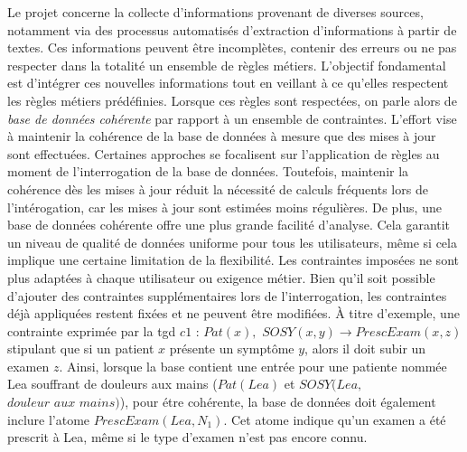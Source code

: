 Le projet concerne la collecte d'informations provenant de diverses sources, notamment via des processus automatisés d'extraction d'informations à partir de textes.
Ces informations peuvent être incomplètes, contenir des erreurs ou ne pas respecter dans la totalité un ensemble de règles métiers.
L'objectif fondamental est d'intégrer ces nouvelles informations tout en veillant à ce qu'elles respectent les règles métiers prédéfinies.
Lorsque ces règles sont respectées, on parle alors de \emph{base de données cohérente} par rapport à un ensemble de contraintes.
L'effort vise à maintenir la cohérence de la base de données à mesure que des mises à jour sont effectuées.
Certaines approches se focalisent sur l'application de règles au moment de l'interrogation de la base de données.
Toutefois, maintenir la cohérence dès les mises à jour réduit la nécessité de calculs fréquents lors de l'intérogation, car les mises à jour sont estimées moins régulières.
De plus, une base de données cohérente offre une plus grande facilité d'analyse. %
Cela garantit un niveau de qualité de données uniforme pour tous les utilisateurs, même si cela implique une certaine limitation de la flexibilité.
Les contraintes imposées ne sont plus adaptées à chaque utilisateur ou exigence métier.
Bien qu'il soit possible d'ajouter des contraintes supplémentaires lors de l'interrogation, les contraintes déjà appliquées restent fixées et ne peuvent être modifiées.
À titre d'exemple, une contrainte exprimée par la \gls{tgd} $c1$ : $Pat(x),$ $SOSY(x, y) \rightarrow PrescExam(x, z)$ stipulant que si un patient $x$ présente un symptôme $y$, alors il doit subir un examen $z$.
Ainsi, lorsque la base contient une entrée pour une patiente nommée Lea souffrant de douleurs aux mains ($Pat(Lea)$ et $ SOSY(Lea,$ $\textit{douleur aux mains})$), pour étre cohérente, la base de données doit également inclure l'atome $PrescExam(Lea, N_1)$.
Cet atome indique qu'un examen a été prescrit à Lea, même si le type d'examen n'est pas encore connu.

